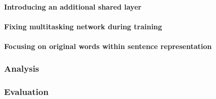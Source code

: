 \paragraph{Introducing an additional shared layer}
\paragraph{Fixing multitasking network during training}
\paragraph{Focusing on original words within sentence representation}
\subsubsection{Analysis}
\subsubsection{Evaluation}